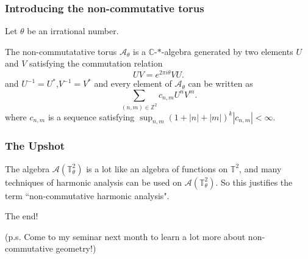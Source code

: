 \documentclass{beamer}
\newcommand{\Cplx}{\mathbb{C}}
\newcommand{\Circ}{\mathbb{T}}
\newcommand{\Itgr}{\mathbb{Z}}
\begin{document}
\begin{frame}
    \frametitle{Introducing the non-commutative torus}
    Let $\theta$ be an irrational number.
    \begin{definition}
        The non-commutatative torus $\mathcal{A}_\theta$ is a $\Cplx$-$*$-algebra
        generated by two elements $U$ and $V$ satisfying the commutation relation
        \begin{equation*}
            UV = e^{2\pi i \theta} VU.
        \end{equation*}
        and $U^{-1} = U^*$,$V^{-1} = V^*$
        and every element of $\mathcal{A}_\theta$ can be written as
        \begin{equation*}
            \sum_{(n,m) \in \Itgr^2} c_{n,m} U^n V^m.
        \end{equation*}
        where $c_{n,m}$ is a sequence satisfying $\sup_{n,m} (1+|n|+|m|)^k |c_{n,m}| < \infty$.
    \end{definition}
\end{frame}

\begin{frame}
    \frametitle{The Upshot}
    The algebra $\mathcal{A}(\Circ^2_\theta)$ is a lot
    like an algebra of functions on $\Circ^2$,
    and many techniques of harmonic analysis can be used
    on $\mathcal{A}(\Circ^2_\theta)$. So this
    justifies the term ``non-commutative harmonic analysis".
\end{frame}

\begin{frame}
    The end!
    
    (p.s. Come to my seminar next month to learn a lot more about non-commutative geometry!)
\end{frame}
\end{document}
